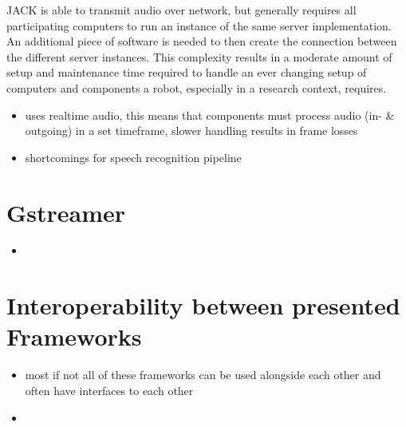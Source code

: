 JACK is able to transmit audio over network, but generally requires all participating computers to run an instance of the same server implementation. 
An additional piece of software is needed to then create the connection between the different server instances. 
This complexity results in a moderate amount of setup and maintenance time required to handle an ever changing setup of computers and components a robot, especially in a research context, requires.



\begin{itemize}
	\item uses realtime audio, this means that components must process audio (in- \& outgoing) in a set timeframe, slower handling results in frame losses
	\item shortcomings for speech recognition pipeline
\end{itemize}

\section{Gstreamer}

\begin{itemize}
	\item 
\end{itemize}


\section{Interoperability between presented Frameworks}
\begin{itemize}
	\item most if not all of these frameworks can be used alongside each other and often have interfaces to each other
	\item 
\end{itemize}


